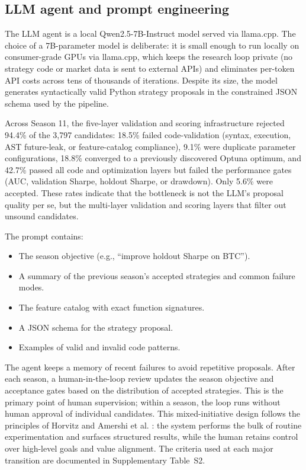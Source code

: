 \documentclass[analytics,article,submit,pdftex,moreauthors]{Definitions/mdpi}
\begin{document}
\subsection{LLM agent and prompt engineering}\label{llm-agent-and-prompt-engineering}

The LLM agent is a local Qwen2.5-7B-Instruct model served via llama.cpp. The choice of a 7B-parameter model is deliberate: it is small enough to run locally on consumer-grade GPUs via llama.cpp, which keeps the research loop private (no strategy code or market data is sent to external APIs) and eliminates per-token API costs across tens of thousands of iterations. Despite its size, the model generates syntactically valid Python strategy proposals in the constrained JSON schema used by the pipeline.

Across Season 11, the five-layer validation and scoring infrastructure rejected 94.4\% of the 3,797 candidates: 18.5\% failed code-validation (syntax, execution, AST future-leak, or feature-catalog compliance), 9.1\% were duplicate parameter configurations, 18.8\% converged to a previously discovered Optuna optimum, and 42.7\% passed all code and optimization layers but failed the performance gates (AUC, validation Sharpe, holdout Sharpe, or drawdown). Only 5.6\% were accepted. These rates indicate that the bottleneck is not the LLM's proposal quality per se, but the multi-layer validation and scoring layers that filter out unsound candidates.

The prompt contains:

\begin{itemize}
\item
  The season objective (e.g., ``improve holdout Sharpe on BTC'').
\item
  A summary of the previous season's accepted strategies and common failure modes.
\item
  The feature catalog with exact function signatures.
\item
  A JSON schema for the strategy proposal.
\item
  Examples of valid and invalid code patterns.
\end{itemize}

The agent keeps a memory of recent failures to avoid repetitive proposals. After each season, a human-in-the-loop review updates the season objective and acceptance gates based on the distribution of accepted strategies. This is the primary point of human supervision; within a season, the loop runs without human approval of individual candidates. This mixed-initiative design follows the principles of Horvitz \citep{horvitz_1999} and Amershi et al. \citep{amershi_2019}: the system performs the bulk of routine experimentation and surfaces structured results, while the human retains control over high-level goals and value alignment. The criteria used at each major transition are documented in Supplementary Table~S2.
\end{document}
